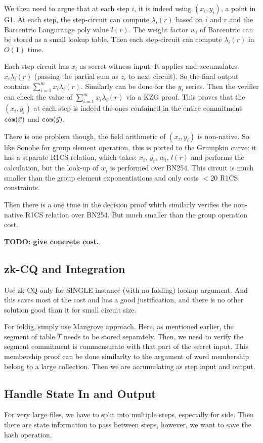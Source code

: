 {{We then need to argue that at each step $i$, it is indeed using 
$(x_i, y_i)$, a point in G1.
At each step, the step-circuit can compute $\lambda_i(r)$ based
on $i$ and $r$ and the Barcentric Langurange poly value $l(r)$.
The weight factor $w_i$ of Barcentric can be stored as a small lookup table.
Then each step-circuit can compute $\lambda_i(r)$ in $O(1)$ time.

Each step circuit has $x_i$ as secret witness input. It applies and
accumulates $x_i \lambda_i(r)$ (passing the partial sum as $z_i$
to next circuit). So the final output contains 
$\sum_{i=1}^m x_i \lambda_i(r)$. Similarly can be done for the
$y_i$ series. Then the verifier can check the value of
$\sum_{i=1}^m x_i \lambda_i(r)$ via a KZG proof. 
This proves that the $(x_i, y_i)$ at each step
is indeed the ones contained in the entire commitment
$\mathtt{com}(\vec{x})$ and $\mathtt{com}(\vec{y})$.

There is one problem though, the field arithmetic of $(x_i, y_i)$
is non-native. So like Sonobe for group element operation,
this is ported to the Grumpkin curve: it has a separate
R1CS relation, which takes: $x_i$, $y_i$, $w_i$, $l(r)$ 
and performs the calculation, but the look-up of $w_i$ is performed
over BN254. This circuit is much smaller than the group element
exponentiations and only costs $<20$ R1CS constraints.

Then there is a one time in the decision proof which similarly
verifies the non-native R1CS relation over BN254. But much smaller
than the group operation cost.

{\bf TODO: give concrete cost.}.

\subsection{zk-CQ and Integration}
Use zk-CQ only for SINGLE instance (with no folding) lookup argument.
And this saves most of the cost and has a good justification, and
there is no other solution good than it for small circuit size.

For foldig, simply use Mangrove approach. Here, as mentioned earlier,
the segment of table $T$ needs to be stored separately. Then,
we need to verify the segment commitment is commensurate with that
part of the secret input. This membership proof can be done similarlty
to the argument of word membership belong to a large collection.
Then we are accumulating as step input and output.

\subsection{Handle State In and Output}
For very large files, we have to split into multiple steps, especially
for side. Then there are state information to pass between steps,
however, we want to save the hash operation.

}}
